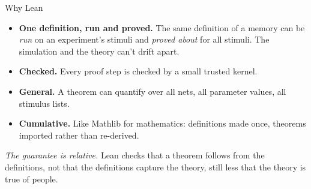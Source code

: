 \documentclass[aspectratio=169,11pt]{beamer}
\begin{document}
\begin{frame}{Why Lean}
  \begin{itemize}
    \item \textbf{One definition, run and proved.} The same definition of a memory can be \emph{run} on an experiment's stimuli and \emph{proved about} for all stimuli. The simulation and the theory can't drift apart.
    \item \textbf{Checked.} Every proof step is checked by a small trusted kernel.
    \item \textbf{General.} A theorem can quantify over all nets, all parameter values, all stimulus lists.
    \item \textbf{Cumulative.} Like Mathlib for mathematics: definitions made once, theorems imported rather than re-derived.
  \end{itemize}
  \bigskip
  \textit{The guarantee is relative.} Lean checks that a theorem follows from the definitions, not that the definitions capture the theory, still less that the theory is true of people.
\end{frame}
\end{document}
